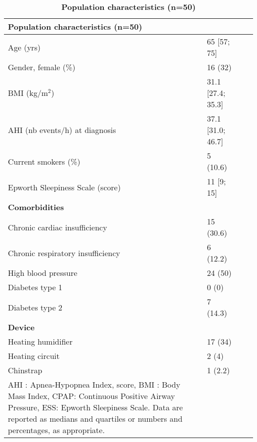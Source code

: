 





\begin{table*}[htbp]
\centering
\caption{\bf Population characteristics (n=50)}
\begin{tableminipage}{\textwidth}
\begin{tabularx}{\textwidth}{XXXX}
\hline
\textbf{Population characteristics (n=50)} &  \\
\hline
Age (yrs) & 65 [57; 75]\\
Gender, female (\%) & 16 (32)\\
BMI (kg/m$^2$) & 31.1 [27.4; 35.3]\\
AHI (nb events/h) at diagnosis & 37.1 [31.0; 46.7]\\
Current smokers (\%) & 5 (10.6)\\
Epworth Sleepiness Scale (score) & 11 [9; 15]\\

\hline
\textbf{Comorbidities} &  \\
\hline
Chronic cardiac insufficiency & 15 (30.6)\\
Chronic respiratory insufficiency & 6 (12.2)\\
High blood pressure & 24 (50)\\
Diabetes type 1 & 0 (0)\\
Diabetes type 2 & 7 (14.3)\\

\hline
\textbf{Device} &  \\
\hline
Heating humidifier & 17 (34)\\
Heating circuit & 2 (4)\\
Chinstrap & 1 (2.2)\\

\hline
{\raggedright AHI : Apnea-Hypopnea Index, score, BMI : Body Mass Index, CPAP: Continuous Positive Airway Pressure, ESS: Epworth Sleepiness Scale. Data are reported as medians and quartiles or numbers and percentages, as appropriate.}
\end{tabularx}
  \label{tab:pop}
\end{tableminipage}
\end{table*}


